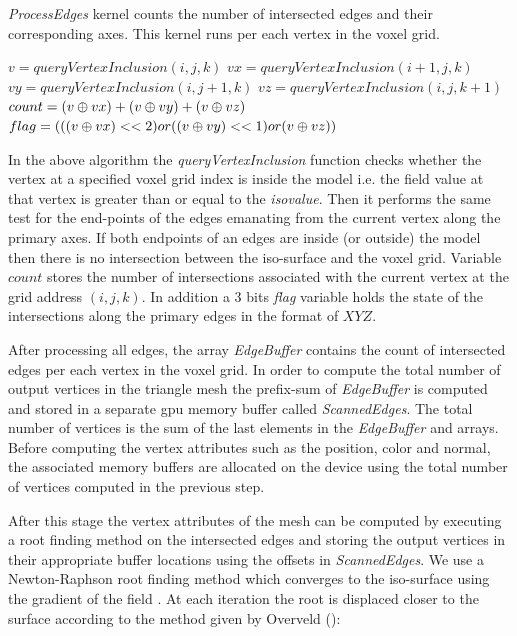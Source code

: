 \begin{algorithm}[H]
\caption{\textit{ProcessEdges} kernel counts the number of intersected edges and their corresponding axes. 
This kernel runs per each vertex in the voxel grid.}
\label{alg:processedgeskernel}
\begin{algorithmic}[1]	
  \STATE $v = queryVertexInclusion(i, j, k)$
  \STATE $vx = queryVertexInclusion(i+1, j, k)$
  \STATE $vy = queryVertexInclusion(i, j+1, k)$
  \STATE $vz = queryVertexInclusion(i, j, k+1)$
  \STATE $count = (v \mathbin{\oplus} vx) + (v \mathbin{\oplus} vy) + (v \mathbin{\oplus} vz)$
  \STATE $flag = (((v \mathbin{\oplus} vx) << 2) or ((v \mathbin{\oplus} vy) << 1) or (v \mathbin{\oplus} vz))$
\end{algorithmic}
\end{algorithm}

In the above algorithm the \textit{queryVertexInclusion} function checks whether the vertex at a specified
voxel grid index is inside the model i.e. the field value at that vertex is greater than or equal to the \textit{isovalue}.
Then it performs the same test for the end-points of the edges emanating from the current vertex along the primary axes.
If both endpoints of an edges are inside (or outside) the model then there is no intersection between the iso-surface and
the voxel grid. Variable $count$ stores the number of intersections associated with the current vertex at the grid address 
$\left(i, j, k\right)$. In addition a 3 bits \textit{flag} variable holds the state of the intersections along the primary 
edges in the format of $XYZ$.

After processing all edges, the array \textit{EdgeBuffer} contains the count of intersected edges per each vertex 
in the voxel grid. In order to compute the total number of output vertices in the triangle mesh the prefix-sum 
\cite{Sengupta2007} of \textit{EdgeBuffer} is computed and stored in a separate gpu memory buffer called 
\textit{ScannedEdges}. The total number of vertices is the sum of the last elements in the \textit{EdgeBuffer} 
and  arrays. Before computing the vertex attributes such as the position, color and normal, the associated 
memory buffers are allocated on the device using the total number of vertices computed in the previous step. 

After this stage the vertex attributes of the mesh can be computed by executing a root finding method on the intersected 
edges and storing the output vertices in their appropriate buffer locations using the offsets in \textit{ScannedEdges}.
We use a Newton-Raphson root finding method which converges to the iso-surface using the gradient of the field \cite{Matthews1987}.
At each iteration the root is displaced closer to the surface according to the method given by Overveld \etal (\cite{VanOverveld2004}):

